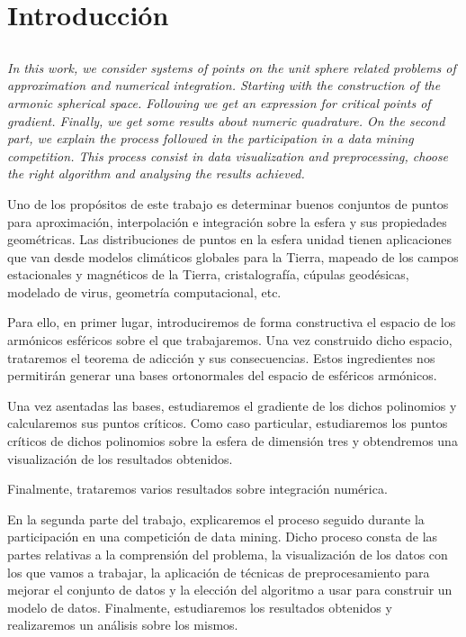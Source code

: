 \chapter*{Introducción}

\section*{}
\emph{In this work, we consider systems of points on the unit sphere related problems of approximation and numerical integration. Starting with the construction of the armonic spherical space. Following we get an expression for critical points of gradient. Finally, we get some results about numeric quadrature.
On the second part, we explain the process followed in the participation in a data mining competition. This process consist in data visualization and preprocessing, choose the right algorithm and analysing the results achieved.}


\bigskip 

Uno de los propósitos de este trabajo es determinar buenos conjuntos de puntos para aproximación, interpolación e integración sobre la esfera y sus propiedades geométricas. Las distribuciones de puntos en la esfera unidad tienen aplicaciones que van desde modelos climáticos globales para la  Tierra, mapeado de los campos estacionales y magnéticos de la Tierra, cristalografía, cúpulas geodésicas, modelado de virus, geometría computacional, etc.
 
\medskip
Para ello, en primer lugar, introduciremos de forma constructiva el espacio de los armónicos esféricos sobre el que trabajaremos. Una vez construido dicho espacio, trataremos el teorema de adicción y sus consecuencias. Estos ingredientes nos permitirán generar una bases ortonormales del espacio de esféricos armónicos.

Una vez asentadas las bases, estudiaremos el gradiente de los dichos polinomios y calcularemos sus puntos críticos. Como caso particular, estudiaremos los puntos críticos de dichos polinomios sobre la esfera de dimensión tres y obtendremos una visualización de los resultados obtenidos.

Finalmente, trataremos varios resultados sobre integración numérica.
\bigskip

En la segunda parte del trabajo, explicaremos el proceso seguido durante la participación en una competición de data mining. Dicho proceso consta de las partes relativas a la comprensión del problema, la visualización de los datos con los que vamos a trabajar, la aplicación de técnicas de preprocesamiento para mejorar el conjunto de datos y la elección del algoritmo a usar para construir un modelo de datos. Finalmente, estudiaremos los resultados obtenidos y realizaremos un análisis sobre los mismos. 

